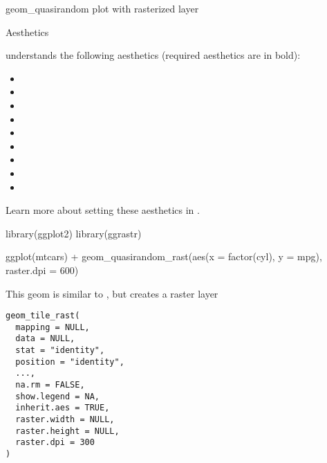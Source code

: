 \documentclass[a4paper]{book}
\begin{document}
%
\begin{Value}
geom\_quasirandom plot with rasterized layer
\end{Value}
%
\begin{Section}{Aesthetics}


 understands the following aesthetics (required aesthetics are in bold):
\begin{itemize}

\item{} 
\item{} 
\item{} 
\item{} 
\item{} 
\item{} 
\item{} 
\item{} 
\item{} 

\end{itemize}

Learn more about setting these aesthetics in .

\end{Section}
%
\begin{Examples}
\begin{ExampleCode}
library(ggplot2)
library(ggrastr)

ggplot(mtcars) + geom_quasirandom_rast(aes(x = factor(cyl), y = mpg), raster.dpi = 600)

\end{ExampleCode}
\end{Examples}
%
\begin{Description}\relax
This geom is similar to , but creates a raster layer
\end{Description}
%
\begin{Usage}
\begin{verbatim}
geom_tile_rast(
  mapping = NULL,
  data = NULL,
  stat = "identity",
  position = "identity",
  ...,
  na.rm = FALSE,
  show.legend = NA,
  inherit.aes = TRUE,
  raster.width = NULL,
  raster.height = NULL,
  raster.dpi = 300
)
\end{verbatim}
\end{Usage}
%
\end{document}
